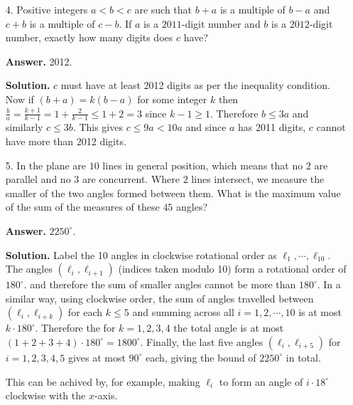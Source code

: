 \documentclass[11pt,a4paper]{article}
\begin{document}
\begin{enumerate}
		\item[4.] Positive integers $a < b < c$ are such that $b + a$ is a multiple of $b - a$ and $c + b$ is a multiple of $c-b$. If $a$ is a $2011$-digit number and $b$ is a $2012$-digit number, exactly how many digits does $c$ have?
		
		\textbf{Answer.} 2012. 
		
		\textbf{Solution.} $c$ must have at least 2012 digits as per the inequality condition. Now if $(b+a)=k(b-a)$ for some integer $k$ then $\frac{b}{a}=\frac{k+1}{k-1}=1+\frac{2}{k-1}\le 1+2=3$ since $k-1\ge 1$. Therefore $b\le 3a$ and similarly $c\le 3b$. This gives $c\le 9a<10a$ and since $a$ has 2011 digits, $c$ cannot have more than 2012 digits. 
		
		\item[5.] In the plane are $10$ lines in general position, which means that no $2$ are parallel and no $3$ are concurrent. Where $2$ lines intersect, we measure the smaller of the two angles formed between them. What is the maximum value of the sum of the measures of these $45$ angles?
		
		\textbf{Answer.} $2250^{\circ}$. 
		
		\textbf{Solution.} Label the 10 angles in clockwise rotational order as $\ell_1, \cdots , \ell_{10}$. The angles $(\ell_i, \ell_{i+1})$ (indices taken modulo 10) form a rotational order of $180^{\circ}$. and therefore the sum of smaller angles cannot be more than $180^{\circ}$. In a similar way, using clockwise order, the sum of angles travelled between $(\ell_i, \ell_{i+k})$ for each $k\le 5$ and summing across all $i=1, 2, \cdots , 10$ is at most $k\cdot 180^{\circ}$. Therefore the for $k=1, 2, 3, 4$ the total angle is at most $(1+2+3+4)\cdot 180^{\circ}=1800^{\circ}$. Finally, the last five angles $(\ell_i, \ell_{i+5})$ for $i=1,2,3,4,5$ gives at most $90^{\circ}$ each, giving the bound of $2250^{\circ}$ in total. 
		
		This can be achived by, for example, making $\ell_i$ to form an angle of $i\cdot 18^{\circ}$ clockwise with the $x$-axis. 
	\end{enumerate}
	
\end{document}
